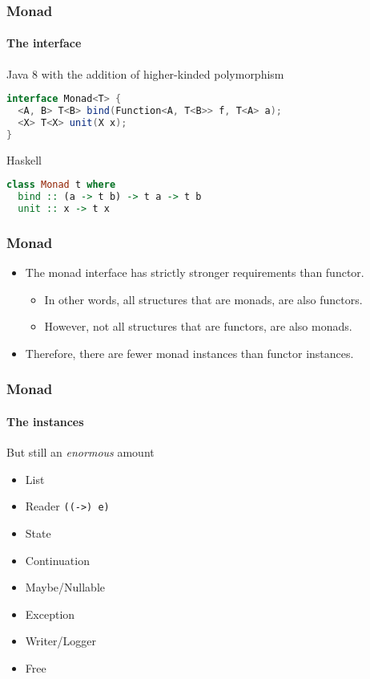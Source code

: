 \begin{frame}[fragile]
\frametitle{Monad}
\framesubtitle{The interface}
\begin{block}{Java 8 with the addition of higher-kinded polymorphism}
\begin{lstlisting}[style=language,language=java]
interface Monad<T> {
  <A, B> T<B> bind(Function<A, T<B>> f, T<A> a);
  <X> T<X> unit(X x);
}
\end{lstlisting}
\end{block}
\begin{block}{Haskell}
\begin{lstlisting}[style=language,language=haskell]
class Monad t where
  bind :: (a -> t b) -> t a -> t b
  unit :: x -> t x
\end{lstlisting}
\end{block}
\end{frame}

\begin{frame}[fragile]
\frametitle{Monad}
\begin{itemize}
\item The monad interface has strictly stronger requirements than functor.
  \begin{itemize}
  \item In other words, all structures that are monads, are also functors.
  \item However, not all structures that are functors, are also monads.
  \end{itemize}
\item Therefore, there are fewer monad instances than functor instances.
\end{itemize}
\end{frame}

\begin{frame}[fragile]
\frametitle{Monad}
\framesubtitle{The instances}
\begin{block}{But still an \emph{enormous} amount}
\begin{itemize}
\item List
\item Reader \lstinline{((->) e)}
\item State
\item Continuation
\item Maybe/Nullable
\item Exception
\item Writer/Logger
\item Free
\end{itemize}
\end{block}
\end{frame}

